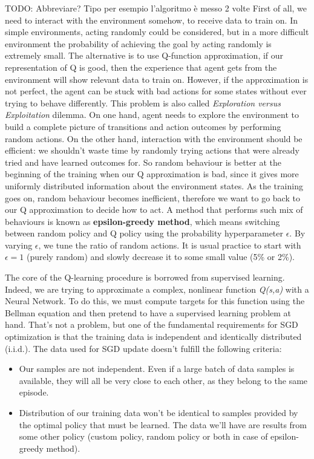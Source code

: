 \documentclass[12pt]{article}
\begin{document}
TODO: Abbreviare? Tipo per esempio l'algoritmo è messo 2 volte
First of all, we need to interact with the environment somehow, to receive data to train on. In simple environments, acting randomly could be considered, but in a more difficult environment the probability of achieving the goal by acting randomly is extremely small. The alternative is to use Q-function approximation, if our representation of Q is good, then the experience that agent gets from the environment will show relevant data to train on. However, if the approximation is not perfect, the agent can be stuck with bad actions for some states without ever trying to behave differently. This problem is also called \textit{Exploration versus Exploitation} dilemma. On one hand, agent needs to explore the environment to build a complete picture of transitions and action outcomes by performing random actions. On the other hand, interaction with the environment should be efficient: we shouldn't waste time by randomly trying actions that were already tried and have learned outcomes for. 
So random behaviour is better at the beginning of the training when our Q approximation is bad, since it gives more uniformly distributed information about the environment states. As the training goes on, random behaviour becomes inefficient, therefore we want to go back to our Q approximation to decide how to act.
A method that performs such mix of behaviours is known as \textbf{epsilon-greedy method}, which means switching between random policy and Q policy using the probability hyperparameter $\epsilon$. By varying $\epsilon$, we tune the ratio of random actions. It is usual practice to start with $\epsilon = 1$ (purely random) and slowly decrease it to some small value (5\% or 2\%).

The core of the Q-learning procedure is borrowed from supervised learning. Indeed, we are trying to approximate a complex, nonlinear function \textit{Q(s,a)} with a Neural Network. To do this, we must compute targets for this function using the Bellman equation and then pretend to have a supervised learning problem at hand. That's not a problem, but one of the fundamental requirements for SGD optimization is that the training data is independent and identically distributed (i.i.d.). The data used for SGD update doesn't fulfill the following criteria:
\begin{itemize}
    \item Our samples are not independent. Even if a large batch of data samples is available, they will all be very close to each other, as they belong to the same episode.
    \item Distribution of our training data won't be identical to samples provided by the optimal policy that must be learned. The data we'll have are results from some other policy (custom policy, random policy or both in case of epsilon-greedy method). 
\end{itemize}
\end{document}
